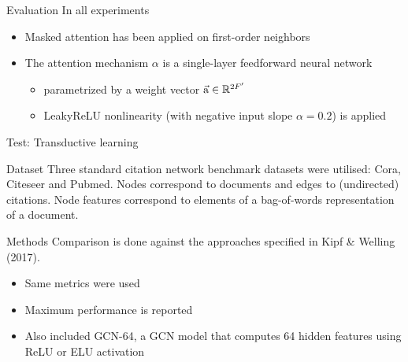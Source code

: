 \documentclass{beamer}
\theoremstyle{definition}
\begin{document}
\begin{frame}{Evaluation}
    In all experiments
    \begin{itemize}
        \item Masked attention has been applied on first-order neighbors
        \item The attention mechanism \(\alpha\) is a single-layer  feedforward  neural  network
            \begin{itemize}
                \item parametrized by a weight vector \(\vec{\rm{a}}\in \mathbb{R}^{2F^\prime}\)
                \item LeakyReLU nonlinearity (with negative input slope \(\alpha = 0.2\)) is applied
            \end{itemize}
    \end{itemize}
\end{frame}

\begin{frame}{Test: Transductive learning}
    \begin{block}{Dataset}
        Three standard  citation  network  benchmark  datasets were utilised: Cora, Citeseer and Pubmed. Nodes correspond to documents and edges to (undirected) citations.  Node features correspond to elements of a bag-of-words representation of a document.
    \end{block} \pause
    \begin{block}{Methods}
        Comparison is done against the approaches specified in Kipf \& Welling (2017).
        \begin{itemize}
            \item Same metrics were used
            \item Maximum performance is reported
            \item Also included GCN-64, a GCN model that computes 64 hidden features using ReLU or ELU activation
        \end{itemize}
    \end{block}
\end{frame}
\end{document}
